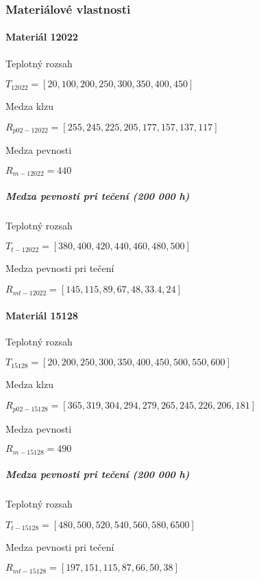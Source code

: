 \documentclass[
  letterpaper,
  DIV=11,
  numbers=noendperiod]{scrartcl}
\let\oldparagraph\paragraph
\renewcommand{\paragraph}[1]{\oldparagraph{#1}\mbox{}}
\let\oldsubparagraph\subparagraph
\renewcommand{\subparagraph}[1]{\oldsubparagraph{#1}\mbox{}}
\begin{document}
\subsubsection{Materiálové
vlastnosti}\label{materiuxe1lovuxe9-vlastnosti}

\paragraph{Materiál 12022}\label{materiuxe1l-12022}

Teplotný rozsah

$\displaystyle T_{12022} = [20, 100, 200, 250, 300, 350, 400, 450]$

Medza klzu

$\displaystyle R_{p02-12022} = [255, 245, 225, 205, 177, 157, 137, 117]$

Medza pevnosti

$\displaystyle R_{m-12022} = 440$

\subparagraph{Medza pevnosti pri tečení (200 000
h)}\label{medza-pevnosti-pri-teux10denuxed-200-000-h}

Teplotný rozsah

$\displaystyle T_{t-12022} = [380, 400, 420, 440, 460, 480, 500]$

Medza pevnosti pri tečení

$\displaystyle R_{mt-12022} = [145, 115, 89, 67, 48, 33.4, 24]$

\paragraph{Materiál 15128}\label{materiuxe1l-15128}

Teplotný rozsah

$\displaystyle T_{15128} = [20, 200, 250, 300, 350, 400, 450, 500, 550, 600]$

Medza klzu

$\displaystyle R_{p02-15128} = [365, 319, 304, 294, 279, 265, 245, 226, 206, 181]$

Medza pevnosti

$\displaystyle R_{m-15128} = 490$

\subparagraph{Medza pevnosti pri tečení (200 000
h)}\label{medza-pevnosti-pri-teux10denuxed-200-000-h-1}

Teplotný rozsah

$\displaystyle T_{t-15128} = [480, 500, 520, 540, 560, 580, 6500]$

Medza pevnosti pri tečení

$\displaystyle R_{mt-15128} = [197, 151, 115, 87, 66, 50, 38]$
\end{document}
